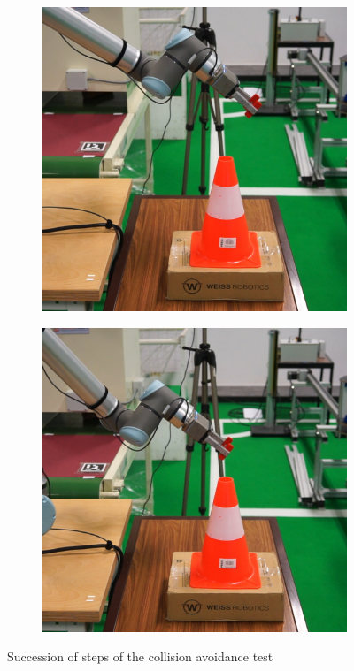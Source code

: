 \begin{figure}[h]
\begin{subfigure}{.2\linewidth}
    \end{subfigure}%
    \begin{subfigure}{.2\linewidth}
        \centering
        \includegraphics[width=.95\linewidth]{figs/chp6/col_real_4.jpg}
    \end{subfigure}%
    \begin{subfigure}{.2\linewidth}
        \centering
        \includegraphics[width=.95\linewidth]{figs/chp6/col_real_5.jpg}
    \end{subfigure}
    \caption{Succession of steps of the collision avoidance test}
    \label{fig:col_real_test}
\end{figure}

